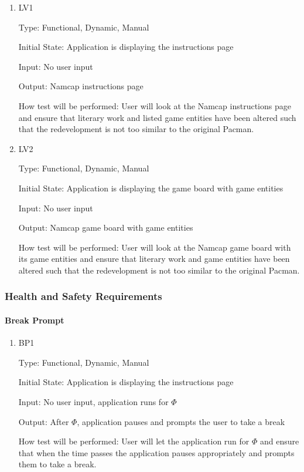 \documentclass[12pt, titlepage]{article}
\begin{document}
\begin{enumerate}

\item{LV1\\}

Type: Functional, Dynamic, Manual
					
Initial State: Application is displaying the instructions page
					
Input: No user input
					
Output: Namcap instructions page
					
How test will be performed: User will look at the Namcap instructions page and ensure that literary work and listed game entities have been altered such that the redevelopment is not too similar to the original Pacman.
					
\item{LV2\\}

Type: Functional, Dynamic, Manual
					
Initial State: Application is displaying the game board with game entities
					
Input: No user input
					
Output: Namcap game board with game entities
					
How test will be performed: User will look at the Namcap game board with its game entities and ensure that literary work and game entities have been altered such that the redevelopment is not too similar to the original Pacman.

\end{enumerate}

\subsubsection{Health and Safety Requirements}

\paragraph{Break Prompt}

\begin{enumerate}

\item{BP1\\}

Type: Functional, Dynamic, Manual
					
Initial State: Application is displaying the instructions page
					
Input: No user input, application runs for $\hyperref[tab:constants]{\Phi}$
					
Output: After $\hyperref[tab:constants]{\Phi}$, application pauses and prompts the user to take a break
					
How test will be performed: User will let the application run for $\hyperref[tab:constants]{\Phi}$ and ensure that when the time passes the application pauses appropriately and prompts them to take a break.

\end{enumerate}
\end{document}
